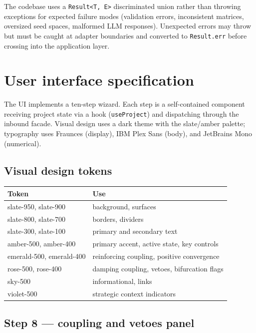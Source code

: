 \documentclass[11pt,a4paper]{article}
\begin{document}
The codebase uses a \texttt{Result<T, E>} discriminated union rather than throwing exceptions for expected failure modes (validation errors, inconsistent matrices, oversized seed spaces, malformed LLM responses). Unexpected errors may throw but must be caught at adapter boundaries and converted to \texttt{Result.err} before crossing into the application layer.

\section{User interface specification}

The UI implements a ten-step wizard. Each step is a self-contained component receiving project state via a hook (\texttt{useProject}) and dispatching through the inbound facade. Visual design uses a dark theme with the slate/amber palette; typography uses Fraunces (display), IBM Plex Sans (body), and JetBrains Mono (numerical).

\subsection{Visual design tokens}

\begin{tabularx}{\textwidth}{lX}
\toprule
\textbf{Token} & \textbf{Use} \\
\midrule
slate-950, slate-900 & background, surfaces \\
slate-800, slate-700 & borders, dividers \\
slate-300, slate-100 & primary and secondary text \\
amber-500, amber-400 & primary accent, active state, key controls \\
emerald-500, emerald-400 & reinforcing coupling, positive convergence \\
rose-500, rose-400 & damping coupling, vetoes, bifurcation flags \\
sky-500 & informational, links \\
violet-500 & strategic context indicators \\
\bottomrule
\end{tabularx}

\subsection{Step 8 — coupling and vetoes panel}
\end{document}
